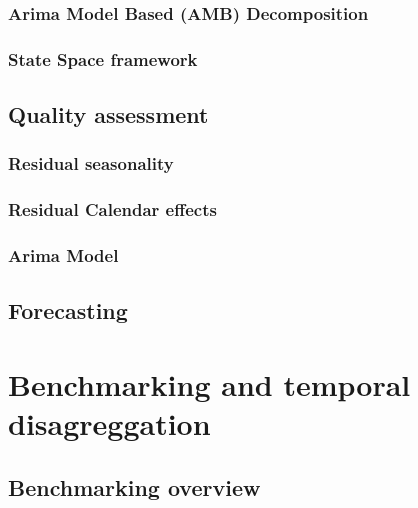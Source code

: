 \documentclass[
  letterpaper,
  DIV=11,
  numbers=noendperiod]{scrreprt}
\begin{document}
\hypertarget{arima-model-based-amb-decomposition}{%
\subsection{Arima Model Based (AMB)
Decomposition}\label{arima-model-based-amb-decomposition}}

\hypertarget{state-space-framework}{%
\subsection{State Space framework}\label{state-space-framework}}

\hypertarget{quality-assessment}{%
\section{Quality assessment}\label{quality-assessment}}

\hypertarget{residual-seasonality}{%
\subsection{Residual seasonality}\label{residual-seasonality}}

\hypertarget{residual-calendar-effects}{%
\subsection{Residual Calendar effects}\label{residual-calendar-effects}}

\hypertarget{arima-model}{%
\subsection{Arima Model}\label{arima-model}}

\hypertarget{forecasting}{%
\section{Forecasting}\label{forecasting}}

\hypertarget{benchmarking-and-temporal-disagreggation}{%
\chapter{Benchmarking and temporal
disagreggation}\label{benchmarking-and-temporal-disagreggation}}

\hypertarget{benchmarking-overview}{%
\section{Benchmarking overview}\label{benchmarking-overview}}
\end{document}
